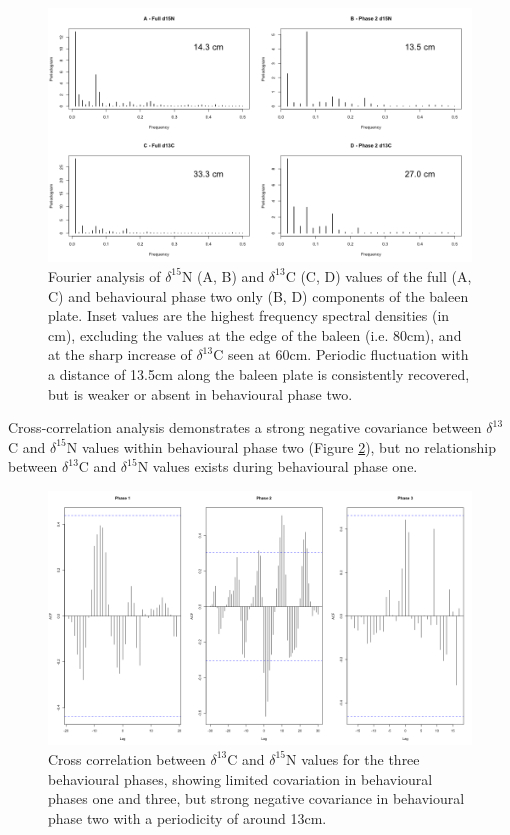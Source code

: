 \documentclass[a4paper,12pt]{article}
\begin{document}
\begin{figure}[!htbp]
  \centering
  \includegraphics[width = \linewidth]{figures/Figure-S1-periodograms.png}
  \caption{Fourier analysis of $\delta^{15}$N (A, B) and $\delta^{13}$C (C, D) values of the full (A, C) and behavioural phase two only (B, D) components of the baleen plate. Inset values are the highest frequency spectral densities (in cm), excluding the values at the edge of the baleen (i.e. 80cm), and at the sharp increase of $\delta^{13}$C seen at 60cm. Periodic fluctuation with a distance of 13.5cm along the baleen plate is consistently recovered, but is weaker or absent in behavioural phase two.} 
  \label{figs1}
\end{figure}
 
Cross-correlation analysis demonstrates a strong negative covariance between $\delta^{13}$C and $\delta^{15}$N  values within behavioural phase two (Figure \ref{figs2}), but no relationship between $\delta^{13}$C and $\delta^{15}$N values exists during behavioural phase one.

\begin{figure}[!htbp]
  \centering
  \includegraphics[width = \linewidth]{figures/Figure-S2-cross-cor.png}
  \caption{Cross correlation between $\delta^{13}$C and $\delta^{15}$N values for the three behavioural phases, showing limited covariation in behavioural phases one and three, but strong negative covariance in behavioural phase two with a periodicity of around 13cm.
  }
  \label{figs2}
\end{figure}
 
\end{document}

